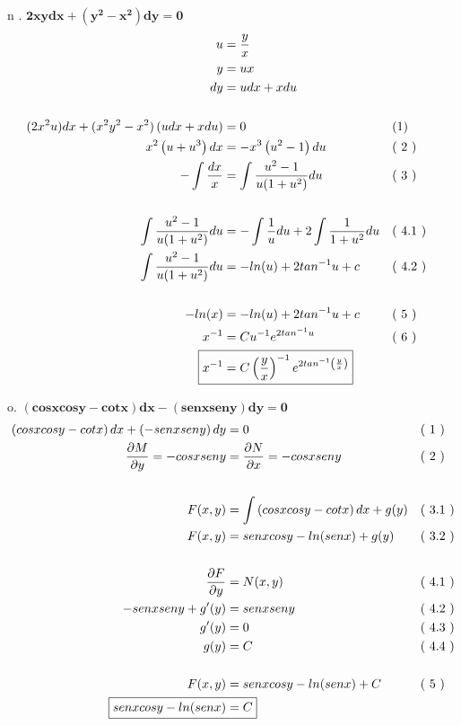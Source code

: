 \documentclass{article}
\newcommand{\newLine}[3]{ #1 & = #2 && \text{(#3)}\\ }
\newcommand{\finalAnswer}[2]{ \Aboxed{ #1 & = #2 } }
\newcommand{\p}[1]{ \left( #1 \right) }
\newcommand{\newProblem}[2]{ \hspace{10mm} #1. $
\boldsymbol{ #2 }
$  \break }
\newcommand{\e}[1]{e^{#1}}
\newcommand{\homogenea}{
    u & = \frac{y}{x} \\
    y & = ux \\
    dy & = udx + xdu\\
}
\newcommand{\pD}[2]{ \frac{\partial #1}{\partial #2} }
\begin{document}
\begin{flushleft}
            \newProblem{ n }{ 2xydx + \p{y^2 - x^2}dy = 0}
                \begin{align*}
                    \homogenea
                    \\
                    \newLine{ (2x^2 u)dx + (x^2y^2 - x^2)\p{udx+xdu} } { 0 } {1}
                    \newLine{ x^2 \p{u+u^3}dx } { -x^3 \p{u^2-1} du } { 2 }
                    \newLine{ -\int \frac{dx}{x} } { \int \frac{u^2-1}{u(1+u^2)} du } { 3 }
                    \\
                        \newLine{ \int \frac{u^2-1}{u(1+u^2)} du } { -\int \frac{ 1 }{ u } du + 2\int \frac{1}{1+u^2} du } { 4.1 }
                        \newLine{ \int \frac{u^2-1}{u(1+u^2)} du } { -ln(u) + 2tan^{-1}u + c} { 4.2 }
                    \\
                    \newLine{ -ln(x) } { -ln(u) + 2tan^{-1}u + c } { 5 }
                    \newLine{ x^{-1} } { Cu^{-1}\e{2tan^{-1}u} } { 6 }
                    \finalAnswer{ x^{-1} } { C\p{\frac{y}{x}}^{-1}\e{2tan^{-1}\p{\frac{y}{x}}} }
                \end{align*}

            \newProblem{o}{ \p{cosxcosy-cotx}dx - \p{senxseny}dy = 0 }
                \begin{align*}
                    \newLine{ \p{cosxcosy-cotx}dx + \p{-senxseny}dy } { 0 } { 1 }
                    \newLine{ \pD{M}{y} = -cosxseny }{ \pD{N}{x} = -cosxseny }{ 2 }
                    \\
                    \newLine{ F(x,y) } { \int \p{cosxcosy-cotx}dx + g(y) } { 3.1 }
                    \newLine{ F(x,y) } { senxcosy - ln(senx) + g(y) } { 3.2 }
                    \\
                    \newLine{ \pD{F}{y} } { N(x,y) } { 4.1 }
                    \newLine{ -senxseny + g'(y) } { senxseny } { 4.2 }
                    \newLine{ g'(y) } { 0 } { 4.3 }
                    \newLine{ g(y) } { C } { 4.4 }
                    \\
                    \newLine{ F(x,y) } { senxcosy - ln(senx) + C } { 5 }
                    \finalAnswer{ senxcosy - ln(senx) }{ C }
                \end{align*}


\end{flushleft}
\end{document}
